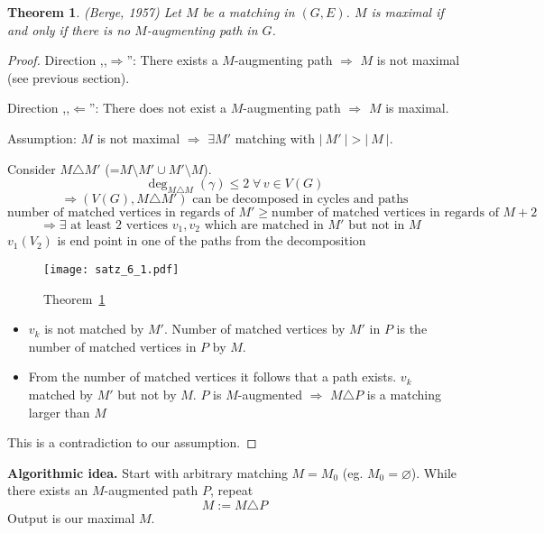 \documentclass{article}
\newtheorem{theorem}{Theorem}
\newcommand{\card}[1]{\left|\:\!#1\:\!\right|}
\newcommand{\fall}{\;\forall\,}
\begin{document}
\begin{theorem}\label{satz-6.1}
  (Berge, 1957)
  Let $M$ be a matching in $(G, E)$. $M$ is maximal if and only if there is no $M$-augmenting path in $G$.
\end{theorem}

\begin{proof}
  Direction ,,$\Rightarrow$'': There exists a $M$-augmenting path $\Rightarrow$ $M$ is not maximal (see previous section).

  Direction ,,$\Leftarrow$'': There does not exist a $M$-augmenting path $\Rightarrow$ $M$ is maximal.

  Assumption: $M$ is not maximal $\Rightarrow$ $\exists M'$ matching with $\card{M'} > \card{M}$.

  Consider $M \triangle M'$ (=$M \setminus M' \cup M' \setminus M$).
  \[ \deg_{M \triangle M}(\gamma) \leq 2 \fall v \in V(G) \]
  \[ \Rightarrow (V(G), M \triangle M') \text{ can be decomposed in cycles and paths} \]
  \[ \text{number of matched vertices in regards of } M' \geq \text{number of matched vertices in regards of } M + 2 \]
  \[ \Rightarrow \exists \text{ at least 2 vertices } v_1, v_2 \text{ which are matched in $M'$ but not in $M$ } \]
  $v_1(V_2)$ is end point in one of the paths from the decomposition

  \begin{figure}[h]
   \begin{center}
    \texttt{[image: satz\_6\_1.pdf]}
    \caption{Theorem~\ref{satz-6.1}}
   \end{center}
  \end{figure}

  \begin{itemize}
    \item $v_k$ is not matched by $M'$. Number of matched vertices by $M'$ in $P$ is the number of matched vertices in $P$ by $M$.
    \item From the number of matched vertices it follows that a path exists. $v_k$ matched by $M'$ but not by $M$. $P$ is $M$-augmented $\Rightarrow$ $M \triangle P$ is a matching larger than $M$
  \end{itemize}
  This is a contradiction to our assumption.
\end{proof}

\textbf{Algorithmic idea.}
  Start with arbitrary matching $M = M_0$ (eg. $M_0 = \diameter$).
  While there exists an $M$-augmented path $P$, repeat
  \[ M := M \triangle P \]
  Output is our maximal $M$.
\end{document}

